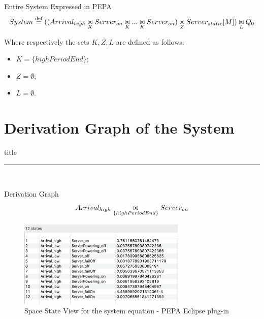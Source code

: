 \documentclass[8pt]{beamer}
\newcommand*{\defeq}{\stackrel{\text{def}}{=}}
\newcommand{\newbowtie}{\mathrel{\ooalign{$\triangleright$\,\cr\,$\triangleleft$}}}
\begin{document}
    \begin{frame}{Entire System Expressed in PEPA}
        \[System \defeq ((Arrival_{high} \underset{K}{\newbowtie}
        Server_{on} \underset{K}{\newbowtie} ... \underset{K}{\newbowtie} Server_{on}) \underset{Z}{\newbowtie} Server_{static}[M]) \underset{L}{\newbowtie} Q_{0}\]
        
        \vspace{1cm}
        Where respectively the sets \(K,Z,L\) are defined as follows:
     
        \begin{itemize}
            \item \(K = \{highPeriodEnd\}\);
            \item \(Z = \emptyset \);
            \item \(L = \emptyset \).
        \end{itemize}
    \end{frame}

\section{Derivation Graph of the System}
    \begin{frame}[plain]
        \vfill
        \centering
        \begin{beamercolorbox}[sep=8pt,center,shadow=true,rounded=true]{title}
            \insertsectionhead\par
            \color{univered}\noindent\rule{10cm}{1pt} \\
            \LARGE{\faFileTextO}
        \end{beamercolorbox}
        \vfill
    \end{frame}

    \begin{frame}{Derivation Graph}
        \[Arrival_{high} \underset{\{highPeriodEnd\}}{\newbowtie} Server_{on} \]
    
        \begin{figure}[h]
            \centering
            \includegraphics[width=8cm]{Images/state-space-view.png}
            \caption{Space State View for the system equation - PEPA Eclipse plug-in}
            \label{fig:space-state-view}
        \end{figure}
    \end{frame}
    
\end{document}
